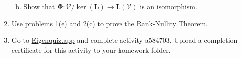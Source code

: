 \documentclass[12pt]{amsart}
\newcommand{\1}{\mathbbm{1}}
\newcounter{Theorem}
\numberwithin{equation}{section}
\numberwithin{Theorem}{section}
\theoremstyle{plain} %
\theoremstyle{definition}
\theoremstyle{remark}
\begin{document}
\begin{enumerate}[1.]
\begin{enumerate}[(a)]
\bigskip

	
	
	

\item Show that \(\mathbf{\Phi}: \mathcal{V}/\operatorname{ker}(\mathbf{L})\to\mathbf{L}(\mathcal{V})\) is an isomorphism.

\bigskip

	
	
	

\end{enumerate}

\item Use problems 1(e) and 2(c) to prove the Rank-Nullity Theorem.

\bigskip

	
	
	

\vspace*{\fill}

\item Go to \href{https://eigenquiz.app/}{Eigenquiz.app} and complete activity a584703. Upload a completion certificate for this activity to your homework folder.

\end{enumerate}
\end{document}

